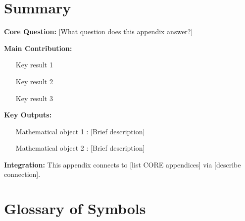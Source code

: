 \section{Summary}
\label{sec:[code]-summary}

\begin{tcolorbox}[colback=green!10!white, colframe=green!75!black, 
    title=\textbf{Appendix [CODE]: Summary}]

\textbf{Core Question:} [What question does this appendix answer?]

\textbf{Main Contribution:}
\begin{itemize}[nosep]
    \item [Key result 1]
    \item [Key result 2]
    \item [Key result 3]
\end{itemize}

\textbf{Key Outputs:}
\begin{itemize}[nosep]
    \item [Mathematical object 1]: [Brief description]
    \item [Mathematical object 2]: [Brief description]
\end{itemize}

\textbf{Integration:} This appendix connects to [list CORE appendices] 
via [describe connection].

\end{tcolorbox}


\section{Glossary of Symbols}
\label{sec:[code]-glossary}

% 
%

